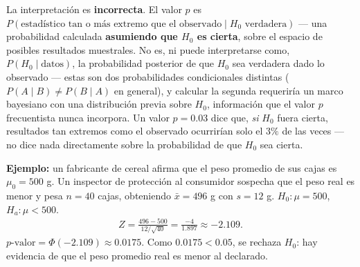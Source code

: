\begin{solproblema}[prob:af3b6da]
	La interpretación es \textbf{incorrecta}. El valor $p$ es $P(\text{estadístico tan o más extremo que el observado}\mid H_0\text{ verdadera})$ — una probabilidad calculada \textbf{asumiendo que $H_0$ es cierta}, sobre el espacio de posibles resultados muestrales. No es, ni puede interpretarse como, $P(H_0\mid\text{datos})$, la probabilidad posterior de que $H_0$ sea verdadera dado lo observado — estas son dos probabilidades condicionales distintas ($P(A\mid B) \neq P(B\mid A)$ en general), y calcular la segunda requeriría un marco bayesiano con una distribución previa sobre $H_0$, información que el valor $p$ frecuentista nunca incorpora. Un valor $p=0.03$ dice que, \emph{si} $H_0$ fuera cierta, resultados tan extremos como el observado ocurrirían solo el $3\%$ de las veces — no dice nada directamente sobre la probabilidad de que $H_0$ sea cierta.
\end{solproblema}

\begin{solproblema}[prob:de31e8f]
	\textbf{Ejemplo:} un fabricante de cereal afirma que el peso promedio de sus cajas es $\mu_0=500$ g. Un inspector de protección al consumidor sospecha que el peso real es menor y pesa $n=40$ cajas, obteniendo $\bar x=496$ g con $s=12$ g. $H_0:\mu=500$, $H_a:\mu<500$.
	\begin{align*}
		Z = \frac{496-500}{12/\sqrt{40}} = \frac{-4}{1.897} \approx-2.109.
	\end{align*}
	$p\text{-valor} = \Phi(-2.109) \approx0.0175$. Como $0.0175<0.05$, se rechaza $H_0$: hay evidencia de que el peso promedio real es menor al declarado.
\end{solproblema}
